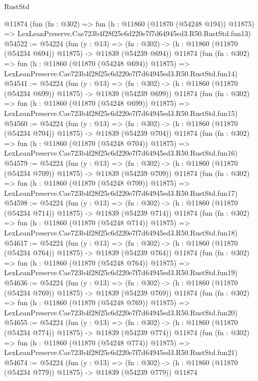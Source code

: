 \begin{lexlean}{RustStd}
\begin{coremodule}
    @11874
    (fun (fn : @302) =>
    fun (h : @11860 (@11870 (@54248 @194)) @11875) =>
    LexLeanPreserve.Cae723b4f28f25c6d220e7f7d64945ed3.R50.RustStd.fun13)
@54522 := @54224
    (fun (y : @13) =>
    (fn : @302) -> (h : @11860 (@11870 (@54234 @694)) @11875) -> @11839 (@54239 @694))
    @11874
    (fun (fn : @302) =>
    fun (h : @11860 (@11870 (@54248 @694)) @11875) =>
    LexLeanPreserve.Cae723b4f28f25c6d220e7f7d64945ed3.R50.RustStd.fun14)
@54541 := @54224
    (fun (y : @13) =>
    (fn : @302) -> (h : @11860 (@11870 (@54234 @699)) @11875) -> @11839 (@54239 @699))
    @11874
    (fun (fn : @302) =>
    fun (h : @11860 (@11870 (@54248 @699)) @11875) =>
    LexLeanPreserve.Cae723b4f28f25c6d220e7f7d64945ed3.R50.RustStd.fun15)
@54560 := @54224
    (fun (y : @13) =>
    (fn : @302) -> (h : @11860 (@11870 (@54234 @704)) @11875) -> @11839 (@54239 @704))
    @11874
    (fun (fn : @302) =>
    fun (h : @11860 (@11870 (@54248 @704)) @11875) =>
    LexLeanPreserve.Cae723b4f28f25c6d220e7f7d64945ed3.R50.RustStd.fun16)
@54579 := @54224
    (fun (y : @13) =>
    (fn : @302) -> (h : @11860 (@11870 (@54234 @709)) @11875) -> @11839 (@54239 @709))
    @11874
    (fun (fn : @302) =>
    fun (h : @11860 (@11870 (@54248 @709)) @11875) =>
    LexLeanPreserve.Cae723b4f28f25c6d220e7f7d64945ed3.R50.RustStd.fun17)
@54598 := @54224
    (fun (y : @13) =>
    (fn : @302) -> (h : @11860 (@11870 (@54234 @714)) @11875) -> @11839 (@54239 @714))
    @11874
    (fun (fn : @302) =>
    fun (h : @11860 (@11870 (@54248 @714)) @11875) =>
    LexLeanPreserve.Cae723b4f28f25c6d220e7f7d64945ed3.R50.RustStd.fun18)
@54617 := @54224
    (fun (y : @13) =>
    (fn : @302) -> (h : @11860 (@11870 (@54234 @764)) @11875) -> @11839 (@54239 @764))
    @11874
    (fun (fn : @302) =>
    fun (h : @11860 (@11870 (@54248 @764)) @11875) =>
    LexLeanPreserve.Cae723b4f28f25c6d220e7f7d64945ed3.R50.RustStd.fun19)
@54636 := @54224
    (fun (y : @13) =>
    (fn : @302) -> (h : @11860 (@11870 (@54234 @769)) @11875) -> @11839 (@54239 @769))
    @11874
    (fun (fn : @302) =>
    fun (h : @11860 (@11870 (@54248 @769)) @11875) =>
    LexLeanPreserve.Cae723b4f28f25c6d220e7f7d64945ed3.R50.RustStd.fun20)
@54655 := @54224
    (fun (y : @13) =>
    (fn : @302) -> (h : @11860 (@11870 (@54234 @774)) @11875) -> @11839 (@54239 @774))
    @11874
    (fun (fn : @302) =>
    fun (h : @11860 (@11870 (@54248 @774)) @11875) =>
    LexLeanPreserve.Cae723b4f28f25c6d220e7f7d64945ed3.R50.RustStd.fun21)
@54674 := @54224
    (fun (y : @13) =>
    (fn : @302) -> (h : @11860 (@11870 (@54234 @779)) @11875) -> @11839 (@54239 @779))
    @11874

\end{coremodule}
\end{lexlean}
